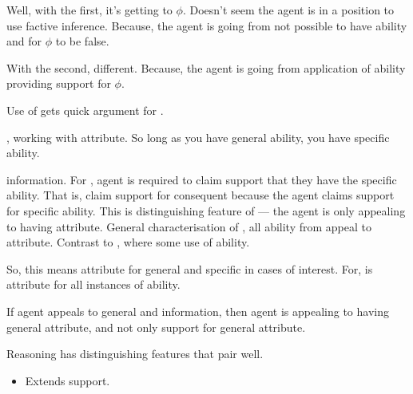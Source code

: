 \hozline{}

\begin{note}
    {
    \color{green}
    Well, with the first, it's getting to \(\phi\).
    Doesn't seem the agent is in a position to use factive inference.
    Because, the agent is going from not possible to have ability and for \(\phi\) to be false.

    With the second, different.
    Because, the agent is going from application of ability providing support for \(\phi\).
  }

  Use of \AR{} gets quick argument for \RBV{}.
\end{note}

\hozline{}

\begin{note}[Application of \nI{} to \AR{}]
  \AR{}, working with attribute.
  So long as you have general ability, you have specific ability.
\end{note}


\begin{note}
  \gsi{} information.
  For \AR{}, agent is required to claim support that they have the specific ability.
  That is, claim support for consequent because the agent claims support for specific ability.
  This is distinguishing feature of \AR{} --- the agent is only appealing to having attribute.
  General characterisation of \AR{}, all ability from appeal to attribute.
  Contrast to \WR{}, where some use of ability.

  So, this means attribute for general and specific in cases of interest.
  For, \AR{} is attribute for all instances of ability.




    If agent appeals to general and information, then agent is appealing to having general attribute, and not only support for general attribute.
\end{note}

\hozline{}

\begin{note}
  Reasoning has distinguishing features that pair well.
  \begin{itemize}
  \item Extends support.
  \end{itemize}
\end{note}


